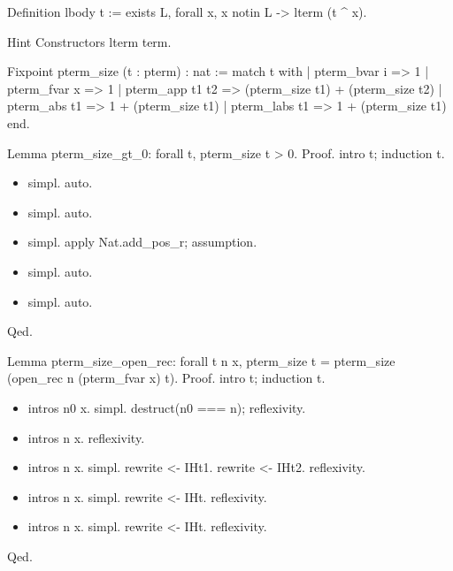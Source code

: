 Definition lbody t :=
  exists L, forall x, x notin L -> lterm (t \^{} x).


Hint Constructors lterm term.










Fixpoint pterm\_size (t : pterm) : nat :=
 match t with
 | pterm\_bvar i    => 1
 | pterm\_fvar x    => 1
 | pterm\_app t1 t2 => (pterm\_size t1) + (pterm\_size t2)
 | pterm\_abs t1    => 1 + (pterm\_size t1)
 | pterm\_labs t1   => 1 + (pterm\_size t1)
 end.


Lemma pterm\_size\_gt\_0: forall t, pterm\_size t > 0.
Proof.
  intro t; induction t.

\begin{itemize}
\item  simpl.
    auto.

\item  simpl.
    auto.

\item  simpl.
    apply Nat.add\_pos\_r; assumption.

\item  simpl.
    auto.

\item  simpl.
    auto.

\end{itemize}
Qed.


Lemma pterm\_size\_open\_rec: forall t n x, pterm\_size t = pterm\_size (open\_rec n (pterm\_fvar x) t).
Proof.
  intro t; induction t.

\begin{itemize}
\item  intros n0 x.
    simpl.
    destruct(n0 === n); reflexivity.

\item  intros n x.
    reflexivity.

\item  intros n x.
    simpl.
    rewrite <- IHt1.
    rewrite <- IHt2.
    reflexivity.

\item  intros n x.
    simpl.
    rewrite <- IHt.
    reflexivity.

\item  intros n x.
    simpl.
    rewrite <- IHt.
    reflexivity.

\end{itemize}
Qed.




